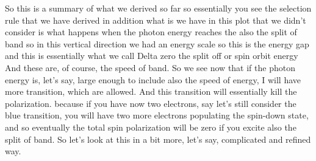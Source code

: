 So this is a summary of what we derived so far so essentially you see the selection rule that we have derived in addition what is we have in this plot that we didn't consider is what happens when the photon energy reaches the also the split of band so in this vertical direction we had an energy scale so this is the energy gap and this is essentially what we call Delta zero the split off or spin orbit energy And these are, of course, the speed of band. So we see now that if the photon energy is, let's say, large enough to include also the speed of energy, I will have more transition, which are allowed. And this transition will essentially kill the polarization. because if you have now two electrons, say let's still consider the blue transition, you will have two more electrons populating the spin-down state, and so eventually the total spin polarization will be zero if you excite also the split of band. So let's look at this in a bit more, let's say, complicated and refined way.
